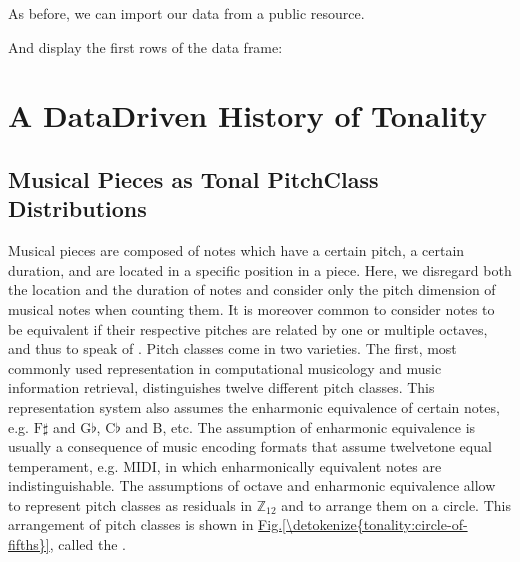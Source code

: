 \documentclass[letterpaper,10pt,english]{sphinxmanual}
\begin{document}
As before, we can import our data from a public resource.

\begin{sphinxVerbatim}[commandchars=\\\{\}]
  
   \PYGZbs{}
\end{sphinxVerbatim}

And display the first rows of the data frame:

\begin{sphinxVerbatim}[commandchars=\\\{\}]
\end{sphinxVerbatim}


\chapter{A Data\sphinxhyphen{}Driven History of Tonality}
\label{\detokenize{tonality:a-data-driven-history-of-tonality}}\label{\detokenize{tonality::doc}}


\section{Musical Pieces as Tonal Pitch\sphinxhyphen{}Class Distributions}
\label{\detokenize{tonality:musical-pieces-as-tonal-pitch-class-distributions}}
Musical pieces are composed of notes which have a certain pitch, a certain duration, and are
located in a specific position in a piece. Here, we disregard both the location and the duration
of notes and consider only the pitch dimension of musical notes when counting them. It is
moreover common to consider notes to be equivalent if their respective pitches are related by
one or multiple octaves, and thus to speak of . Pitch classes come in two varieties.
The first, most commonly used representation in computational musicology and music
information retrieval, distinguishes twelve different pitch classes. This representation system
also assumes the enharmonic equivalence of certain notes, e.g. \(\text{F}\sharp\)
and \(\text{G}\flat\), \(\text{C}\flat\) and B, etc. The
assumption of enharmonic equivalence is usually a consequence of music encoding formats
that assume twelve\sphinxhyphen{}tone equal temperament, e.g. MIDI, in which enharmonically equivalent
notes are indistinguishable. The assumptions of octave and enharmonic equivalence allow to
represent pitch classes as residuals in \(\mathbb{Z}_{12}\) and to arrange them on a circle.
This arrangement of pitch classes is shown in \hyperref[\detokenize{tonality:circle-of-fifths}]{Fig.\@ \ref{\detokenize{tonality:circle-of-fifths}}}, called the .
\end{document}
